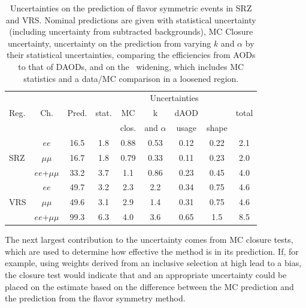 \begin{table}[!ht]
\begin{center}
 \begin{tabular}{lcc|cccccc}
 \hline 
 \multirow{3}{*}{Reg.}	& \multirow{3}{*}{Ch.} 	& \multirow{3}{*}{Pred.} & \multicolumn{6}{c}{Uncertainties} \\
   \cline{4-9} 
   		 	& 		 	& 	  		& stat.  		& MC 		& k  			& dAOD 		& \mll  	& total \\
   			& 			& 		 	& 			 	& clos. 	& and $\alpha$	& usage	 	& shape  	& \\
   \hline
   \hline
\multirow{3}{*}{SRZ}
& $ee$            & 16.5 & 1.8 & 0.88 & 0.53 & 0.12 & 0.22 & 2.1 \\ 
& $\mu\mu$        & 16.7 & 1.8 & 0.79 & 0.33 & 0.11 & 0.23 & 2.0 \\ 
& $ee$+$\mu\mu$   & 33.2 & 3.7 & 1.1 & 0.86 & 0.23 & 0.45 & 4.0 \\ 
\hline
\multirow{3}{*}{VRS}
& $ee$            & 49.7 & 3.2 & 2.3 & 2.2 & 0.34 & 0.75 & 4.6 \\ 
& $\mu\mu$        & 49.6 & 3.1 & 2.9 & 1.4 & 0.31 & 0.75 & 4.6 \\ 
& $ee$+$\mu\mu$   & 99.3 & 6.3 & 4.0 & 3.6 & 0.65 & 1.5 & 8.5 \\ 
\hline
 
\hline
\hline
 \end{tabular}
\end{center}
 \caption{
   Uncertainties on the prediction of flavor symmetric events in SRZ and VRS. Nominal predictions are given with statistical uncertainty (including uncertainty from subtracted backgrounds), MC Closure uncertainty, uncertainty on the prediction from varying $k$ and $\alpha$ by their statistical uncertainties, comparing the efficiencies from AODs to that of DAODs, and on the \mll~widening, which includes MC statistics and a data/MC comparison in a loosened region.
 }
 \label{tab:fs_errors}
\end{table}

The next largest contribution to the uncertainty comes from \ac{MC} closure tests, which are used to determine how effective the method is in its prediction. If, for example, using weights derived from an inclusive selection at high \met lead to a bias, the closure test would indicate that and an appropriate uncertainty could be placed on the estimate based on the difference between the \ac{MC} prediction and the prediction from the flavor symmetry method. 

